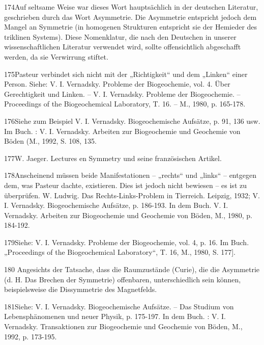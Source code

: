 \documentclass[11pt,a4paper]{book}
\begin{document}
174Auf seltsame Weise war dieses Wort hauptsächlich in der deutschen Literatur, geschrieben durch das Wort Asymmetrie. Die Asymmetrie entspricht jedoch dem Mangel an Symmetrie (in homogenen Strukturen entspricht sie der Hemieder des triklinen Systems). Diese Nomenklatur, die nach den Deutschen in unserer wissenschaftlichen Literatur verwendet wird, sollte offensichtlich abgeschafft werden, da sie Verwirrung stiftet.



175Pasteur verbindet sich nicht mit der „Richtigkeit“ und dem „Linken“ einer Person. Siehe: V. I. Vernadsky. Probleme der Biogeochemie, vol. 4. Über Gerechtigkeit und Linken. -- V. I. Vernadsky. Probleme der Biogeochemie. -- Proceedings of the Biogeochemical Laboratory, T. 16. -- M., 1980, p. 165-178.



176Siehe zum Beispiel V. I. Vernadsky. Biogeochemische Aufsätze, p. 91, 136 usw. Im Buch. : V. I. Vernadsky. Arbeiten zur Biogeochemie und Geochemie von Böden (M., 1992, S. 108, 135.



177W. Jaeger. Lectures en Symmetry und seine französischen Artikel.



178Anscheinend müssen beide Manifestationen -- „rechts“ und „links“ -- entgegen dem, was Pasteur dachte, existieren. Dies ist jedoch nicht bewiesen -- es ist zu überprüfen. W. Ludwig. Das Rechts-Links-Problem in Tierreich. Leipzig, 1932; V. I. Vernadsky. Biogeochemische Aufsätze, p. 186-193. In dem Buch. V. I. Vernadsky. Arbeiten zur Biogeochemie und Geochemie von Böden, M., 1980, p. 184-192.



179Siehe: V. I. Vernadsky. Probleme der Biogeochemie, vol. 4, p. 16. Im Buch. „Proceedings of the Biogeochemical Laboratory“, T. 16, M., 1980, S. 177].



180 Angesichts der Tatsache, dass die Raumzustände (Curie), die die Asymmetrie (d. H. Das Brechen der Symmetrie) offenbaren, unterschiedlich sein können, beispielsweise die Dissymmetrie des Magnetfelds.



181Siehe: V. I. Vernadsky. Biogeochemische Aufsätze. -- Das Studium von Lebensphänomenen und neuer Physik, p. 175-197. In dem Buch. : V. I. Vernadsky. Transaktionen zur Biogeochemie und Geochemie von Böden, M., 1992, p. 173-195.
\end{document}
